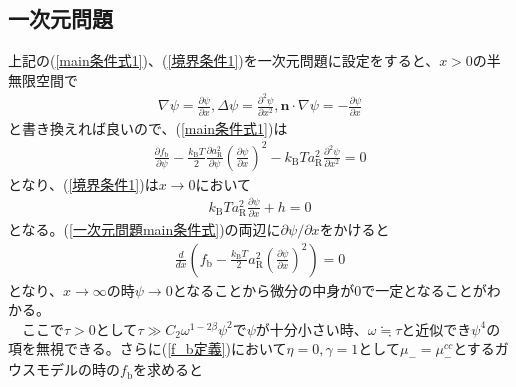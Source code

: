 \documentclass[a4paper,12pt, oneside, openany]{jsbook}
\begin{document}
\subsection{一次元問題}
上記の(\ref{main条件式1})、(\ref{境界条件1})を一次元問題に設定をすると、$x>0$の半無限空間で
\begin{eqnarray}
  \nabla \psi =\frac{\partial\psi}{\partial x},\Delta \psi =\frac{\partial ^2\psi }{\partial x^2},\boldsymbol{n}\cdot \nabla \psi= -\frac{\partial \psi}{\partial x}
\end{eqnarray}
と書き換えれば良いので、(\ref{main条件式1})は
\begin{eqnarray}
  \label{一次元問題main条件式}
  \frac{\partial f_{\text{b}}}{\partial \psi}  - \frac{k_{\text{B}} T}{2}\frac{\partial a^2_{\text{R}}}{\partial \psi }\left(\frac{\partial\psi}{\partial x}\right)^2  -k_{\text{B}} T a^2_{\text{R}} \frac{\partial ^2 \psi}{\partial x^2} =0
\end{eqnarray}
となり、(\ref{境界条件1})は$x \rightarrow 0$において
\begin{eqnarray}
  \label{一次元問題境界条件}
  k_{\text{B}} T a^2_{\text{R}} \frac{\partial \psi}{\partial x} +h=0
\end{eqnarray}
となる。(\ref{一次元問題main条件式})の両辺に$\partial \psi/\partial x$をかけると
\begin{eqnarray}
  \frac{d }{dx} \left(f_{\text{b}} -\frac{k_{\text{B}} T}{2}a^2 _{\text{R}}\left(\frac{\partial \psi}{\partial x}\right)^2 \right) =0
\end{eqnarray}
となり、$x\rightarrow \infty$の時$\psi \rightarrow 0$となることから微分の中身が0で一定となることがわかる。\\
　ここで$\tau >0$として$\tau \gg C_2 \omega ^{1-2\beta}\psi^2$で$\psi$が十分小さい時、$\omega \fallingdotseq \tau$と近似でき$\psi^4$の項を無視できる。さらに(\ref{f_b定義})において$\eta=0,\gamma=1$として$\mu_-=\mu_-^{cc}$とするガウスモデルの時の$f_{\text{b}}$を求めると
\end{document}
